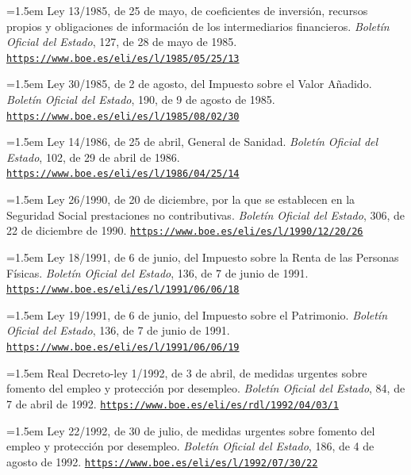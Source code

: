 \documentclass[10pt,a4paper]{article}
\begin{document}
\noindent\hangindent=1.5em Ley 13/1985, de 25 de mayo, de coeficientes de inversión, recursos propios y obligaciones de información de los intermediarios financieros. \textit{Boletín Oficial del Estado}, 127, de 28 de mayo de 1985. \href{https://www.boe.es/eli/es/l/1985/05/25/13}{\nolinkurl{https://www.boe.es/eli/es/l/1985/05/25/13}}

\noindent\hangindent=1.5em Ley 30/1985, de 2 de agosto, del Impuesto sobre el Valor Añadido. \textit{Boletín Oficial del Estado}, 190, de 9 de agosto de 1985. \href{https://www.boe.es/eli/es/l/1985/08/02/30}{\nolinkurl{https://www.boe.es/eli/es/l/1985/08/02/30}}

\noindent\hangindent=1.5em Ley 14/1986, de 25 de abril, General de Sanidad. \textit{Boletín Oficial del Estado}, 102, de 29 de abril de 1986. \href{https://www.boe.es/eli/es/l/1986/04/25/14}{\nolinkurl{https://www.boe.es/eli/es/l/1986/04/25/14}}

\noindent\hangindent=1.5em Ley 26/1990, de 20 de diciembre, por la que se establecen en la Seguridad Social prestaciones no contributivas. \textit{Boletín Oficial del Estado}, 306, de 22 de diciembre de 1990. \href{https://www.boe.es/eli/es/l/1990/12/20/26}{\nolinkurl{https://www.boe.es/eli/es/l/1990/12/20/26}}

\noindent\hangindent=1.5em Ley 18/1991, de 6 de junio, del Impuesto sobre la Renta de las Personas Físicas. \textit{Boletín Oficial del Estado}, 136, de 7 de junio de 1991. \href{https://www.boe.es/eli/es/l/1991/06/06/18}{\nolinkurl{https://www.boe.es/eli/es/l/1991/06/06/18}}

\noindent\hangindent=1.5em Ley 19/1991, de 6 de junio, del Impuesto sobre el Patrimonio. \textit{Boletín Oficial del Estado}, 136, de 7 de junio de 1991. \href{https://www.boe.es/eli/es/l/1991/06/06/19}{\nolinkurl{https://www.boe.es/eli/es/l/1991/06/06/19}}

\noindent\hangindent=1.5em Real Decreto-ley 1/1992, de 3 de abril, de medidas urgentes sobre fomento del empleo y protección por desempleo. \textit{Boletín Oficial del Estado}, 84, de 7 de abril de 1992. \href{https://www.boe.es/eli/es/rdl/1992/04/03/1}{\nolinkurl{https://www.boe.es/eli/es/rdl/1992/04/03/1}}

\noindent\hangindent=1.5em Ley 22/1992, de 30 de julio, de medidas urgentes sobre fomento del empleo y protección por desempleo. \textit{Boletín Oficial del Estado}, 186, de 4 de agosto de 1992. \href{https://www.boe.es/eli/es/l/1992/07/30/22}{\nolinkurl{https://www.boe.es/eli/es/l/1992/07/30/22}}
\end{document}
